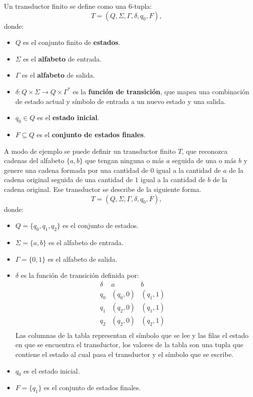 \documentclass[12pt]{article}
\begin{document}
Un transductor finito se define como una 6-tupla:
\[
  T = (Q, \Sigma, \Gamma, \delta, q_0, F),
\]
donde:
\begin{itemize}
  \item \(Q\) es el conjunto finito de \textbf{estados}.
  \item \(\Sigma\) es el \textbf{alfabeto} de entrada.
  \item \(\Gamma\) es el \textbf{alfabeto} de salida.
  \item \(\delta: Q \times \Sigma \to Q \times \Gamma^*\) es la \textbf{función de transición}, que mapea una combinación de estado actual y símbolo de entrada a un nuevo estado y una salida.
  \item \(q_0 \in Q\) es el \textbf{estado inicial}.
  \item \(F \subseteq Q\) es el \textbf{conjunto de estados finales}.
\end{itemize}

A modo de ejemplo se puede definir un transductor finito $T$, que reconozca cadenas del alfabeto $\{a,b\}$
que tengan ninguna o más $a$ seguida de una o más $b$ y genere una cadena formada por una cantidad de $0$ igual
a la cantidad de $a$ de la cadena original seguida de una cantidad de $1$ igual a la cantidad de $b$ de
la cadena original. Ese transductor se describe de la siguiente forma.
\[
  T = (Q, \Sigma, \Gamma, \delta, q_0, F),
\]
donde:
\begin{itemize}
  \item \(Q = \{q_0, q_1, q_2\}\) es el conjunto de estados.
  \item \(\Sigma = \{a, b\}\) es el alfabeto de entrada.
  \item \(\Gamma = \{0, 1\}\) es el alfabeto de salida.
  \item \(\delta\) es la función de transición definida por:
        \[
          \begin{array}{c|c|c}
            \delta & a        & b        \\
            \hline
            q_0    & (q_0, 0) & (q_1, 1) \\
            q_1    & (q_2, 0) & (q_1, 1) \\
            q_2    & (q_2, 0) & (q_2, 1) \\
          \end{array}
        \]
        Las columnas de la tabla representan el símbolo que se lee y las filas el estado en que se encuentra el transductor, 
        los valores de la tabla son una tupla que contiene el estado al cual pasa el transductor y el símbolo que se escribe.
  \item \(q_0\) es el estado inicial.
  \item \(F = \{q_1\}\) es el conjunto de estados finales.
\end{itemize}
\end{document}
